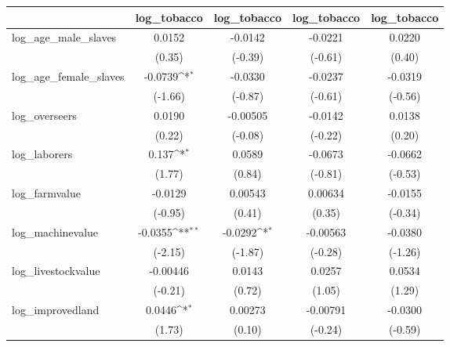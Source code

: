 {
\def\sym#1{\ifmmode^{#1}\else\(^{#1}\)\fi}
\begin{tabular}{l*{4}{c}}
\hline\hline
            &\multicolumn{1}{c}{log\_tobacco}&\multicolumn{1}{c}{log\_tobacco}&\multicolumn{1}{c}{log\_tobacco}&\multicolumn{1}{c}{log\_tobacco}\\
\hline
log\_age\_male\_slaves&      0.0152         &     -0.0142         &     -0.0221         &      0.0220         \\
            &      (0.35)         &     (-0.39)         &     (-0.61)         &      (0.40)         \\
[1em]
log\_age\_female\_slaves&     -0.0739\sym{*}  &     -0.0330         &     -0.0237         &     -0.0319         \\
            &     (-1.66)         &     (-0.87)         &     (-0.61)         &     (-0.56)         \\
[1em]
log\_overseers&      0.0190         &    -0.00505         &     -0.0142         &      0.0138         \\
            &      (0.22)         &     (-0.08)         &     (-0.22)         &      (0.20)         \\
[1em]
log\_laborers&       0.137\sym{*}  &      0.0589         &     -0.0673         &     -0.0662         \\
            &      (1.77)         &      (0.84)         &     (-0.81)         &     (-0.53)         \\
[1em]
log\_farmvalue&     -0.0129         &     0.00543         &     0.00634         &     -0.0155         \\
            &     (-0.95)         &      (0.41)         &      (0.35)         &     (-0.34)         \\
[1em]
log\_machinevalue&     -0.0355\sym{**} &     -0.0292\sym{*}  &    -0.00563         &     -0.0380         \\
            &     (-2.15)         &     (-1.87)         &     (-0.28)         &     (-1.26)         \\
[1em]
log\_livestockvalue&    -0.00446         &      0.0143         &      0.0257         &      0.0534         \\
            &     (-0.21)         &      (0.72)         &      (1.05)         &      (1.29)         \\
[1em]
log\_improvedland&      0.0446\sym{*}  &     0.00273         &    -0.00791         &     -0.0300         \\
            &      (1.73)         &      (0.10)         &     (-0.24)         &     (-0.59)         \\

\end{tabular}}
